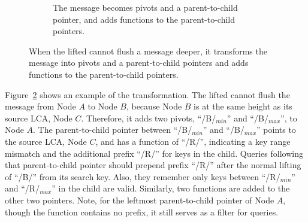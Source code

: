 \begin{figure}
\begin{subfigure}{\textwidth}
        \caption{\label{subfig:spvt-2} The \goto message becomes pivots and a
            parent-to-child pointer, and adds \xf functions to the parent-to-child pointers.}
    \end{subfigure}
    \caption[Transform a \goto message into pivots and a parent-to-child pointer]{\label{fig:spvt}
        When the lifted \bedag cannot flush a \goto message deeper, it
        transforms the \goto message into pivots and a parent-to-child pointers
        and adds \xf functions to the parent-to-child pointers.}
\end{figure}

Figure~\ref{fig:spvt} shows an example of the transformation.
The lifted \bedag cannot flush the \goto message from Node $A$ to Node $B$,
because Node $B$ is at the same height as its source LCA, Node $C$.
Therefore, it adds two pivots, ``/B/$_{min}$'' and ``/B/$_{max}$'', to Node $A$.
The parent-to-child pointer between ``/B/$_{min}$'' and ``/B/$_{max}$'' points
to the source LCA, Node $C$, and has a \xf function of ``/R/'', indicating a
key range mismatch and the additional prefix ``/R/'' for keys in the child.
Queries following that parent-to-child pointer should prepend prefix ``/R/''
after the normal lifting of ``/B/'' from its search key.
Also, they remember only keys between ``/R/$_{min}$'' and ``/R/$_{max}$'' in
the child are valid.
Similarly, two \xf functions are added to the other two pointers.
Note, for the leftmost parent-to-child pointer of Node $A$, though the \xf
function contains no prefix, it still serves as a filter for queries.

